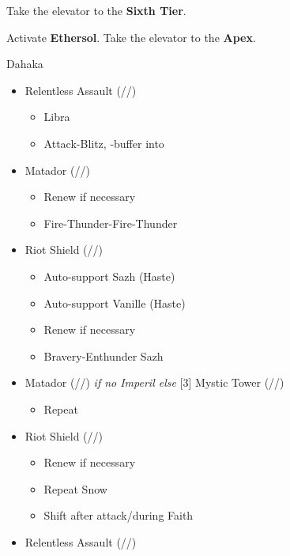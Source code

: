 \begin{multicols}{2}
\renewcommand{\first}{[1] Riot Shield (\syn/\sen/\rav)}
\renewcommand{\second}{[2] Relentless Assault (\com/\rav/\rav)}
\renewcommand{\third}{[3] Mystic Tower (\rav/\sen/\rav)}
\renewcommand{\fourth}{[4] Aggression (\com/\com/\rav)}
\renewcommand{\fifth}{[5] Matador (\rav/\sen/\sab)}
\renewcommand{\sixth}{[6] Aggression (\com/\com/\rav)}

Take the elevator to the \textbf{Sixth Tier}.

Activate \textbf{Ethersol}.
Take the elevator to the \textbf{Apex}.

\begin{battle}{Dahaka}
\begin{itemize}
    \item \second
    \begin{itemize}
        \item Libra
        \item Attack-Blitz, \rav-buffer into
    \end{itemize}
    \item \fifth
    \begin{itemize}
        \item Renew if necessary
        \item Fire-Thunder-Fire-Thunder
    \end{itemize}
    \item \first
    \begin{itemize}
        \item Auto-support Sazh (Haste)
        \item Auto-support Vanille (Haste)
        \item Renew if necessary
        \item Bravery-Enthunder Sazh
    \end{itemize}
    \item \fifth \textit{ if no Imperil else } \third
    \begin{itemize}
        \item Repeat
    \end{itemize}
    \item \first
    \begin{itemize}
        \item Renew if necessary
        \item Repeat Snow
        \item Shift after attack/during Faith
    \end{itemize}
    \item \second
    \begin{itemize}

\end{itemize}
\end{itemize}
\end{battle}
\end{multicols}
